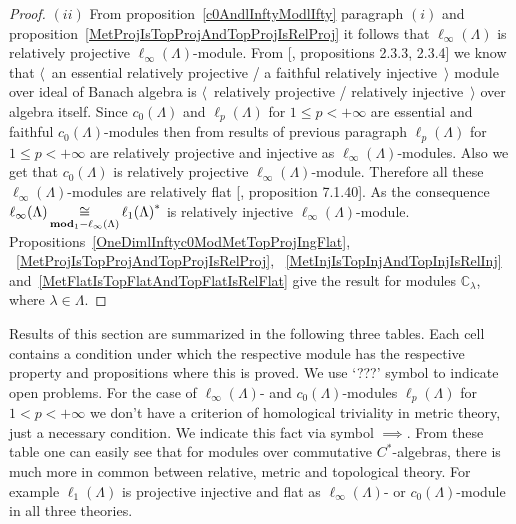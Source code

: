 \begin{proof}
$(ii)$ From proposition~\ref{c0AndlInftyModlIfty} paragraph $(i)$ and
proposition~\ref{MetProjIsTopProjAndTopProjIsRelProj} it follows that
$\ell_\infty(\Lambda)$ is relatively projective $\ell_\infty(\Lambda)$-module.
From [\cite{RamsHomPropSemgroupAlg}, propositions 2.3.3, 2.3.4] we know that
$\langle$~an essential relatively projective / a  faithful relatively
injective~$\rangle$ module over ideal of Banach algebra is $\langle$~relatively
projective / relatively injective~$\rangle$ over algebra itself. Since
$c_0(\Lambda)$ and $\ell_p(\Lambda)$ for $1\leq p<+\infty$ are essential and
faithful $c_0(\Lambda)$-modules then from results of previous paragraph
$\ell_p(\Lambda)$ for $1\leq p<+\infty$ are relatively projective and injective
as $\ell_\infty(\Lambda)$-modules. Also we get that $c_0(\Lambda)$ is relatively
projective $\ell_\infty(\Lambda)$-module. Therefore all these
$\ell_\infty(\Lambda)$-modules are relatively flat [\cite{HelBanLocConvAlg},
proposition 7.1.40]. As the consequence
$\ell_\infty(\Lambda)
\mathop{\mathbin{\cong}}\limits_{\mathbf{mod}_1-\ell_\infty(\Lambda)}
{\ell_1(\Lambda)}^*$
is relatively injective $\ell_\infty(\Lambda)$-module.
Propositions~\ref{OneDimlInftyc0ModMetTopProjIngFlat},
~\ref{MetProjIsTopProjAndTopProjIsRelProj},
~\ref{MetInjIsTopInjAndTopInjIsRelInj}
and~\ref{MetFlatIsTopFlatAndTopFlatIsRelFlat} give the result for modules
$\mathbb{C}_\lambda$, where $\lambda\in\Lambda$.
\end{proof}

Results of this section are summarized in the following three tables. Each cell
contains a condition under which the respective module has the respective
property and propositions where this is proved. We use `???' symbol to indicate
open problems. For the case of $\ell_\infty(\Lambda)$- and
$c_0(\Lambda)$-modules $\ell_p(\Lambda)$ for $1<p<+\infty$ we don't have a
criterion of homological triviality in metric theory, just a necessary
condition. We indicate this fact via symbol $\implies$. From these table one can
easily see that for modules over commutative $C^*$-algebras, there is much more
in common between relative, metric and topological  theory. For example
$\ell_1(\Lambda)$ is projective injective and flat as $\ell_\infty(\Lambda)$- or
$c_0(\Lambda)$-module in all three theories.


